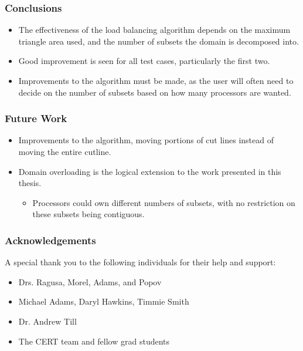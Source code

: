 \documentclass[]{beamer}
\begin{document}
\begin{frame}[t]\frametitle{Conclusions}
\begin{block}{}
\begin{itemize}
\item The effectiveness of the load balancing algorithm depends on the maximum triangle area used, and the number of subsets the domain is decomposed into.
\item Good improvement is seen for all test cases, particularly the first two. 
\item Improvements to the algorithm must be made, as the user will often need to decide on the number of subsets based on how many processors are wanted. 
\end{itemize}
\end{block}
\end{frame}

\begin{frame}[t]\frametitle{Future Work}
\begin{block}{}
\begin{itemize}
\item Improvements to the algorithm, moving portions of cut lines instead of moving the entire cutline.
\item Domain overloading is the logical extension to the work presented in this thesis.
\begin{itemize} 
\item Processors could own different numbers of subsets, with no restriction on these subsets being contiguous.
\end{itemize}
\end{itemize}
\end{block}
\end{frame}

\begin{frame}[t]\frametitle{Acknowledgements}
\begin{block}{}
A special thank you to the following individuals for their help and support:
\begin{itemize}
\item Drs. Ragusa, Morel, Adams, and Popov
\item Michael Adams, Daryl Hawkins, Timmie Smith
\item Dr. Andrew Till
\item The CERT team and fellow grad students
\end{itemize}
\end{block}
\end{frame}


%
%



%	
%	
%	
%	
%
\end{document}
